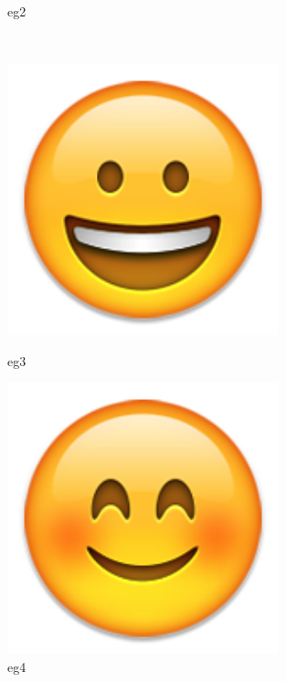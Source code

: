 \begin{solution}
\begin{enumerate}[nosep,label=(\arabic*)]
\begin{itemize}
\begin{latexamplev}[]
\begin{figure}[H]
\begin{minipage}[b]{0.3\textwidth}
	\caption{eg2}
  \end{minipage} \\
  \begin{minipage}[b]{0.3\textwidth}
	\centering
	\includegraphics[width=0.7\textwidth]{./pic/03.png}
	\caption{eg3}
  \end{minipage}
  \hspace{-0.03\textwidth}
  \begin{minipage}[b]{0.3\textwidth}
	\centering
	\includegraphics[width=0.7\textwidth]{./pic/04.png}
	\caption{eg4}
  \end{minipage}
  \hspace{-0.03\textwidth}
  \begin{minipage}[b]{0.3\textwidth}
	\centering

\end{minipage}
\end{figure}
\end{latexamplev}
\end{itemize}
\end{enumerate}
\end{solution}
